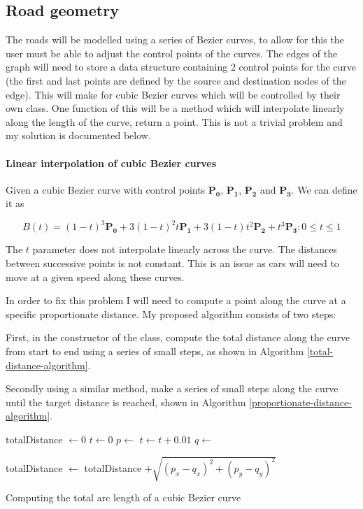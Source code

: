    \subsection{Road geometry}

    The roads will be modelled using a series of Bezier curves, to allow for this the user must be able to adjust the control points of the curves. The edges of the graph will need to store a data structure containing 2 control points for the curve (the first and last points are defined by the source and destination nodes of the edge). This will make for cubic Bezier curves which will be controlled by their own  class. One function of this will be a  method which will interpolate linearly along the length of the curve, return a point. This is not a trivial problem and my solution is documented below.

    \paragraph{Linear interpolation of cubic Bezier curves}

    Given a cubic Bezier curve with control points $\mathbf{P_0}$, $\mathbf{P_1}$, $\mathbf{P_2}$ and $\mathbf{P_3}$. We can define it as

    \[B(t) = (1 - t)^3\mathbf{P_0} + 3(1 - t)^2t\mathbf{P_1} + 3(1 - t)t^2\mathbf{P_2} + t^3\mathbf{P_3} : 0 \leq t \leq 1\]

    The $t$ parameter does not interpolate linearly across the curve. The distances between successive points is not constant. This is an issue as cars will need to move at a given speed along these curves.

    In order to fix this problem I will need to compute a point along the curve at a specific proportionate distance. My proposed algorithm consists of two steps:

    First, in the constructor of the class, compute the total distance along the curve from start to end using a series of small steps, as shown in Algorithm \ref{total-distance-algorithm}.

    Secondly using a similar method, make a series of small steps along the curve until the target distance is reached, shown in Algorithm \ref{proportionate-distance-algorithm}.

    \begin{algorithm}
        \begin{algorithmic}
            \State totalDistance $\gets 0$
            \State $t \gets 0$
                \State $p \gets$ 
                \State $t \gets t + 0.01$
                \State $q \gets$ 

                \State totalDistance $\gets$ totalDistance $+ \sqrt{(p_x - q_x)^2 + (p_y - q_y)^2}$
            \EndWhile
        \end{algorithmic}
        \caption{Computing the total arc length of a cubic Bezier curve}
        \label{total-distance-algorithm}
    \end{algorithm}

